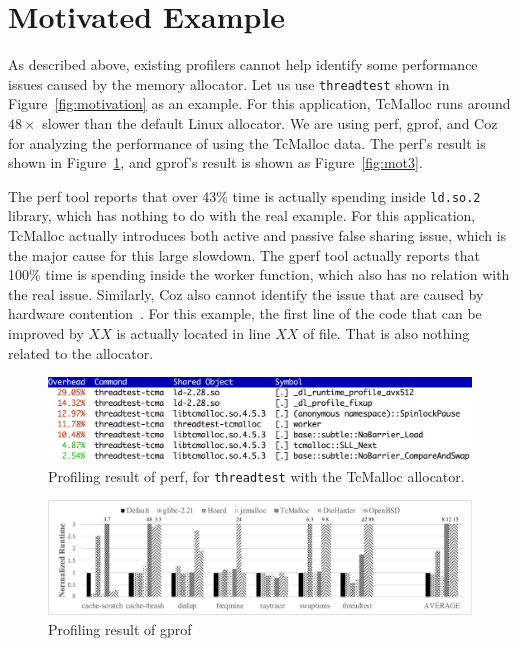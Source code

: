 \section{Motivated Example}
\label{sec:motivation}

As described above, existing profilers cannot help identify some performance issues caused by the memory allocator. Let us use \texttt{threadtest} shown in Figure~\ref{fig:motivation} as an example. For this application, TcMalloc runs around $48\times$ slower than the default Linux allocator. We are using perf, gprof, and Coz for analyzing the performance of using the TcMalloc data.  The perf's result is shown in Figure~\ref{fig:mot1}, and gprof's result is shown as Figure~\ref{fig:mot3}. 

The perf tool reports that over 43\% time is actually spending inside \texttt{ld.so.2} library, which has nothing to do with the real example. For this application, TcMalloc actually introduces both active and passive false sharing issue, which is the major cause for this large slowdown. The gperf tool actually reports that 100\% time is spending inside the worker function, which also has no relation with the real issue. Similarly, Coz also cannot identify the issue that are caused by hardware contention~\cite{DBLP:conf/osdi/ZhouGMW18}. For this example, the first line of the code that can be improved by $XX$ is actually located in line $XX$ of \texttt{} file. That is also nothing related to the allocator.  

\begin{figure}[!ht]
\centering
\includegraphics[width=\columnwidth]{figures/threadtest-tcmalloc}
\caption{Profiling result of perf, for \texttt{threadtest} with the TcMalloc allocator. \label{fig:mot1}}
\end{figure}

\begin{figure}[!ht]
\centering
\includegraphics[width=\columnwidth]{figures/regular-performance}
\caption{Profiling result of gprof\label{fig:mot2}}
\end{figure}

